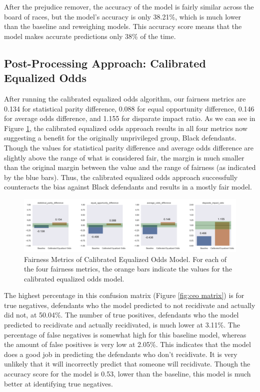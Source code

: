 \documentclass[water,article,submit,moreauthors,pdftex]{mdpi}
\begin{document}
After the prejudice remover, the accuracy of the model is fairly similar
across the board of races, but the model's accuracy is only 38.21\%,
which is much lower than the baseline and reweighing models. This
accuracy score means that the model makes accurate predictions only 38\%
of the time.

\hypertarget{post-processing-approach-calibrated-equalized-odds}{%
\subsection{Post-Processing Approach: Calibrated Equalized
Odds}\label{post-processing-approach-calibrated-equalized-odds}}

After running the calibrated equalized odds algorithm, our fairness
metrics are 0.134 for statistical parity difference, 0.088 for equal
opportunity difference, 0.146 for average odds difference, and 1.155 for
disparate impact ratio. As we can see in Figure \ref{fig:ceo metrics},
the calibrated equalized odds approach results in all four metrics now
suggesting a benefit for the originally unprivileged group, Black
defendants. Though the values for statistical parity difference and
average odds difference are slightly above the range of what is
considered fair, the margin is much smaller than the original margin
between the value and the range of fairness (as indicated by the blue
bars). Thus, the calibrated equalized odds approach successfully
counteracts the bias against Black defendants and results in a mostly
fair model.

\begin{figure}

{\centering \includegraphics[width=1\linewidth]{../images/calibrated_equalized_odds_metrics} 

}

\caption{Fairness Metrics of Calibrated Equalized Odds Model. For each of the four fairness metrics, the orange bars indicate the values for the calibrated equalized odds model.}\label{fig:ceo metrics}
\end{figure}

The highest percentage in this confusion matrix (Figure
\ref{fig:ceo matrix}) is for true negatives, defendants who the model
predicted to not recidivate and actually did not, at 50.04\%. The number
of true positives, defendants who the model predicted to recidivate and
actually recidivated, is much lower at 3.11\%. The percentage of false
negatives is somewhat high for this baseline model, whereas the amount
of false positives is very low at 2.05\%. This indicates that the model
does a good job in predicting the defendants who don't recidivate. It is
very unlikely that it will incorrectly predict that someone will
recidivate. Though the accuracy score for the model is 0.53, lower than
the baseline, this model is much better at identifying true negatives.
\end{document}
